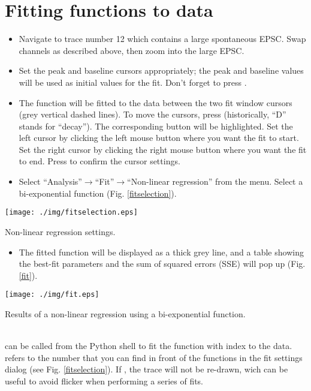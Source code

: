 \section{Fitting functions to data}
\begin{itemize}
\item Navigate to trace number 12 which contains a large spontaneous EPSC. Swap channels as described above, then zoom into the large EPSC.
\item Set the peak and baseline cursors appropriately; the peak and baseline values will be used as initial values for the fit. Don't forget to press .
\item The function will be fitted to the data between the two fit window cursors (grey vertical dashed lines). To move the cursors, press  (historically, ``D'' stands for ``decay''). The corresponding button will be highlighted. Set the left cursor by clicking the left mouse button where you want the fit to start. Set the right cursor by clicking the right mouse button where you want the fit to end. Press  to confirm the cursor settings.
\item Select ``Analysis''$\rightarrow$``Fit''$\rightarrow$``Non-linear regression'' from the menu. Select a bi-exponential function (Fig. \ref{fitselection}).
\end{itemize}
  \begin{myfigure}[ht]
    \begin{center}
      \texttt{[image: ./img/fitselection.eps]}
    \end{center}
    \caption{Non-linear regression settings.}
    \label{fitselection}
  \end{myfigure}
\begin{itemize}
\item The fitted function will be displayed as a thick grey line, and a table showing the best-fit parameters and the sum of squared errors (SSE) will pop up (Fig. \ref{fit}).
\end{itemize}
  \begin{myfigure}[ht]
    \begin{center}
      \texttt{[image: ./img/fit.eps]}
    \end{center}
    \caption{Results of a non-linear regression using a bi-exponential function.}
    \label{fit}
  \end{myfigure}
\\ can be called from the Python shell to fit the function with index  to the data.  refers to the number that you can find in front of the functions in the fit settings dialog (see Fig. \ref{fitselection}). If , the trace will not be re-drawn, wich can be useful to avoid flicker when performing a series of fits.
